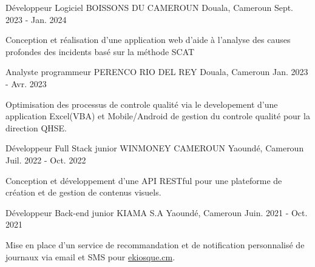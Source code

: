 

\begin{cventries}

  \cventry
    {Développeur Logiciel} %
    {BOISSONS DU CAMEROUN} %
    {Douala, Cameroun} %
    {Sept. 2023 - Jan. 2024} %
    {
      \begin{cvitems} %
        \item {Conception et réalisation d'une application web d'aide à l'analyse des causes profondes des incidents basé sur la méthode SCAT}
      \end{cvitems}
    }

  \cventry
    {Analyste programmeur} %
    {PERENCO RIO DEL REY} %
    {Douala, Cameroun} %
    {Jan. 2023 - Avr. 2023} %
    {
      \begin{cvitems} %
        \item {Optimisation des processus de controle qualité via le developement d'une application Excel(VBA) et Mobile/Android de gestion du controle qualité pour la direction QHSE.}
      \end{cvitems}
    }

  \cventry
    {Développeur Full Stack junior} %
    {WINMONEY CAMEROUN} %
    {Yaoundé, Cameroun} %
    {Juil. 2022 - Oct. 2022} %
    {
      \begin{cvitems} %
        \item {Conception et développement d'une API RESTful pour une plateforme de création et de gestion de contenus visuels.}
      \end{cvitems}
    }

  \cventry
    {Développeur Back-end junior} %
    {KIAMA S.A} %
    {Yaoundé, Cameroun} %
    {Juin. 2021 - Oct. 2021} %
    {
      \begin{cvitems} %
        \item {Mise en place d'un service de recommandation et de notification personnalisé de journaux via email et SMS pour \href{https://ekiosque.cm/}{ekiosque.cm}}.
      \end{cvitems}
    }

\end{cventries}
